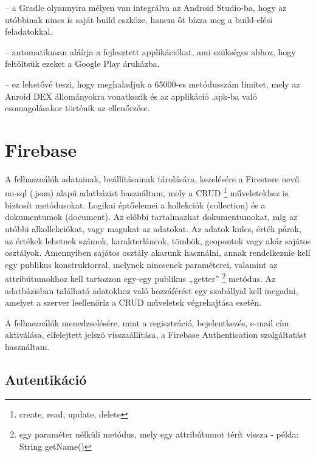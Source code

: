 \begin{description}
	\setlength{\itemsep}{0.04mm}
	\item[Teljes integráció az Android Studio-val] -- a Gradle olyannyira mélyen van integrálva az Android Studio-ba, hogy az utóbbinak nincs is saját build eszköze, hanem őt bízza meg a build-elési feladatokkal.
	\item[Automatikus aláírás] -- automatikusan aláírja a fejlesztett applikációkat, ami szükséges ahhoz, hogy feltöltsük ezeket a Google Play áruházba.
	\item[Multidex támogatás] -- ez lehetővé teszi, hogy meghaladjuk a 65000-es metódusszám limitet, mely az Anroid DEX állományokra vonatkozik és az applikáció .apk-ba való csomagolásakor történik az ellenőrzése.
\end{description}

\section{Firebase}\label{sec:ALAP:szerkeszt}

A felhasználók adatainak, beállításainak tárolására, kezelésére a Firestore nevű no-sql (.json) alapú adatbázist használtam, mely a CRUD%
\footnote{ %
	create, read, update, delete
}  %
 műveletekhez is biztosít metódusokat. Logikai éptőelemei a kollekciók (collection) és a dokumentumok (document). Az előbbi tartalmazhat dokumentumokat, míg az utóbbi alkollekciókat, vagy magukat az adatokat. Az adatok kulcs, érték párok, az értékek lehetnek számok, karakterláncok, tömbök, geopontok vagy akár sajátos osztályok. Amennyiben sajátos osztály akarunk használni, annak rendelkeznie kell egy publikus konstruktorral, melynek nincsenek paraméterei, valamint az attribútumokhoz kell tartozzon egy-egy publikus „getter”%
 \footnote{ %
 	egy paraméter nélküli metódus, mely egy attribútumot térít vissza - példa: String getName()
 }  %
 metódus. Az adatbázisban található adatokhoz való hozzáférést egy szabállyal kell megadni, amelyet a szerver leellenőriz a CRUD műveletek végrehajtása esetén.

A felhasználók menedzselésére, mint a regisztráció, bejelentkezés, e-mail cím aktiválása, elfelejtett jelszó visszaállítása, a Firebase Authentication szolgáltatást használtam.

\subsection{Autentikáció}

